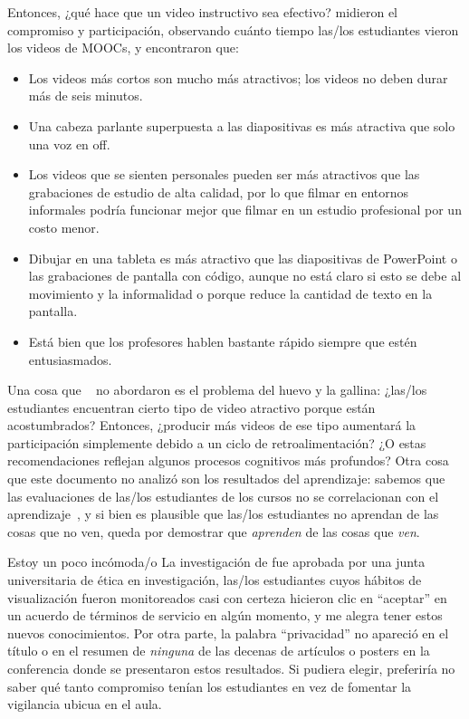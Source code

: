 Entonces, ¿qué hace que un video instructivo sea efectivo?
\cite{Guo2014} midieron el compromiso y participación, observando cuánto tiempo las/los estudiantes vieron los videos de MOOCs,
y encontraron que:

\begin{itemize}

\item
  Los videos más cortos son mucho más atractivos; los videos no deben durar más de seis minutos.

\item
  Una cabeza parlante superpuesta a las diapositivas es más atractiva que solo una voz en off.

\item
  Los videos que se sienten personales pueden ser más atractivos que las grabaciones de estudio de alta calidad,
  por lo que filmar en entornos informales podría funcionar mejor que filmar en un estudio profesional por un costo menor.

\item
  Dibujar en una tableta es más atractivo que las diapositivas de PowerPoint o las grabaciones de pantalla con código,
  aunque no está claro si esto se debe al movimiento y la informalidad
  o porque reduce la cantidad de texto en la pantalla.

\item
  Está bien que los profesores hablen bastante rápido siempre que estén entusiasmados.

\end{itemize}

Una cosa que ~\cite{Guo2014} no abordaron es el problema del huevo y la gallina:
¿las/los estudiantes encuentran cierto tipo de video atractivo porque están acostumbrados?
Entonces, ¿producir más videos de ese tipo aumentará la participación simplemente debido a un ciclo de retroalimentación?
¿O estas recomendaciones reflejan algunos procesos cognitivos más profundos?
Otra cosa que este documento no analizó son los resultados del aprendizaje:
sabemos que las evaluaciones de las/los estudiantes de los cursos no se correlacionan con el aprendizaje~\cite{Star2014,Uttl2017},
y si bien es plausible que las/los estudiantes no aprendan de las cosas que no ven,
queda por demostrar que \emph{aprenden} de las cosas que \emph{ven}.

\begin{aside}{Estoy un poco incómoda/o}
  La investigación de \cite{Guo2014} fue aprobada por una junta universitaria de ética en investigación,
  las/los estudiantes cuyos hábitos de visualización fueron monitoreados casi con certeza hicieron clic en ``aceptar''
  en un acuerdo de términos de servicio en algún momento,
  y me alegra tener estos nuevos conocimientos.
  Por otra parte,
  la palabra ``privacidad'' no apareció en el título o en el resumen
  de \emph{ninguna} de las decenas de artículos o posters en la conferencia donde se presentaron estos resultados.
  Si pudiera elegir,
  preferiría no saber qué tanto compromiso tenían los estudiantes en vez de fomentar la vigilancia ubicua en el aula.
\end{aside}

